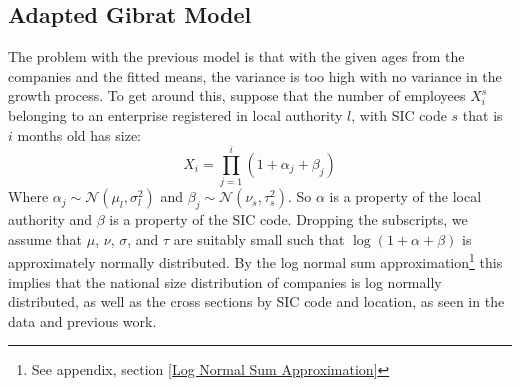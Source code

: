 \documentclass[a4paper,10pt]{article}
\begin{document}
\subsection{Adapted Gibrat Model}
The problem with the previous model is that with the given ages from the companies and the fitted means, the variance is too high with no variance in the growth process. To get around this, suppose that the number of employees  $X_i^s$ belonging to an enterprise registered in local authority $l$, with SIC code $s$ that is $i$ months old has size:
\begin{equation}
 X_i = \prod_{j = 1}^i(1 + \alpha_j + \beta_j)
 \label{2 parameter model}
\end{equation}
Where $\alpha_j \sim \mathcal{N}(\mu_l, \sigma^2_l)$ and $\beta_j \sim \mathcal{N}(\nu_s, \tau^2_s)$. So $\alpha$ is a property of the local authority and $\beta$ is a property of the SIC code. 
Dropping the subscripts, we assume that $\mu$, $\nu$, $\sigma$, and $\tau$ are suitably small such that $\log(1 + \alpha + \beta)$ is approximately normally distributed. By the log normal sum approximation\footnote{See appendix, section \ref{Log Normal Sum Approximation}} this implies that the national size distribution of companies is log normally distributed, as well as the cross sections by SIC code and location, as seen in the data and previous work.
\end{document}
